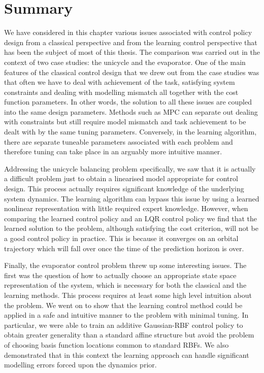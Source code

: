 \section{Summary}
We have considered in this chapter various issues associated with control policy design from a classical perspective and from the learning control perspective that has been the subject of most of this thesis. The comparison was carried out in the context of two case studies: the unicycle and the evaporator. One of the main features of the classical control design that we drew out from the case studies was that often we have to deal with achievement of the task, satisfying system constraints and dealing with modelling mismatch all together with the cost function parameters. In other words, the solution to all these issues are coupled into the same design parameters. Methods such as MPC can separate out dealing with constraints but still require model mismatch and task achievement to be dealt with by the same tuning parameters. Conversely, in the learning algorithm, there are separate tuneable parameters associated with each problem and therefore tuning can take place in an arguably more intuitive manner.

Addressing the unicycle balancing problem specifically, we saw that it is actually a difficult problem just to obtain a linearised model appropriate for control design. This process actually requires significant knowledge of the underlying system dynamics. The learning algorithm can bypass this issue by using a learned nonlinear representation with little required expert knowledge. However, when comparing the learned control policy and an LQR control policy we find that the learned solution to the problem, although satisfying the cost criterion, will not be a good control policy in practice. This is because it converges on an orbital trajectory which will fall over once the time of the prediction horizon is over. 

Finally, the evaporator control problem threw up some interesting issues.  The first was the question of how to actually choose an appropriate state space representation of the system, which is necessary for both the classical and the learning methods. This process requires at least some high level intuition about the problem. We went on to show that the learning control method could be applied in a safe and intuitive manner to the problem with minimal tuning. In particular, we were able to train an additive Gaussian-RBF control policy to obtain greater generality than a standard affine structure but avoid the problem of choosing basis function locations common to standard RBFs. We also demonstrated that in this context the learning approach can handle significant modelling errors forced upon the dynamics prior. 


